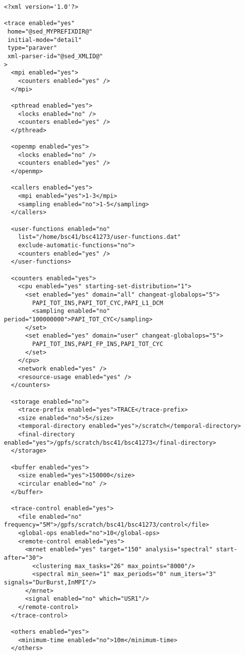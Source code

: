 \begin{verbatim}
<?xml version='1.0'?>

<trace enabled="yes"
 home="@sed_MYPREFIXDIR@"
 initial-mode="detail"
 type="paraver"
 xml-parser-id="@sed_XMLID@"
>
  <mpi enabled="yes">
    <counters enabled="yes" />
  </mpi>

  <pthread enabled="yes">
    <locks enabled="no" />
    <counters enabled="yes" />
  </pthread>

  <openmp enabled="yes">
    <locks enabled="no" />
    <counters enabled="yes" />
  </openmp>

  <callers enabled="yes">
    <mpi enabled="yes">1-3</mpi>
    <sampling enabled="no">1-5</sampling>
  </callers>

  <user-functions enabled="no"
    list="/home/bsc41/bsc41273/user-functions.dat"
    exclude-automatic-functions="no">
    <counters enabled="yes" />
  </user-functions>

  <counters enabled="yes">
    <cpu enabled="yes" starting-set-distribution="1">
      <set enabled="yes" domain="all" changeat-globalops="5">
        PAPI_TOT_INS,PAPI_TOT_CYC,PAPI_L1_DCM
        <sampling enabled="no" period="100000000">PAPI_TOT_CYC</sampling>
      </set>
      <set enabled="yes" domain="user" changeat-globalops="5">
        PAPI_TOT_INS,PAPI_FP_INS,PAPI_TOT_CYC
      </set>
    </cpu>
    <network enabled="yes" />
    <resource-usage enabled="yes" />
  </counters>

  <storage enabled="no">
    <trace-prefix enabled="yes">TRACE</trace-prefix>
    <size enabled="no">5</size>
    <temporal-directory enabled="yes">/scratch</temporal-directory>
    <final-directory enabled="yes">/gpfs/scratch/bsc41/bsc41273</final-directory>
  </storage>

  <buffer enabled="yes">
    <size enabled="yes">150000</size>
    <circular enabled="no" />
  </buffer>

  <trace-control enabled="yes">
    <file enabled="no" frequency="5M">/gpfs/scratch/bsc41/bsc41273/control</file>
    <global-ops enabled="no">10</global-ops>
    <remote-control enabled="yes">
      <mrnet enabled="yes" target="150" analysis="spectral" start-after="30">
        <clustering max_tasks="26" max_points="8000"/>
        <spectral min_seen="1" max_periods="0" num_iters="3" signals="DurBurst,InMPI"/>
      </mrnet>
      <signal enabled="no" which="USR1"/>
    </remote-control>
  </trace-control> 

  <others enabled="yes">
    <minimum-time enabled="no">10m</minimum-time>
  </others>


\end{verbatim}
